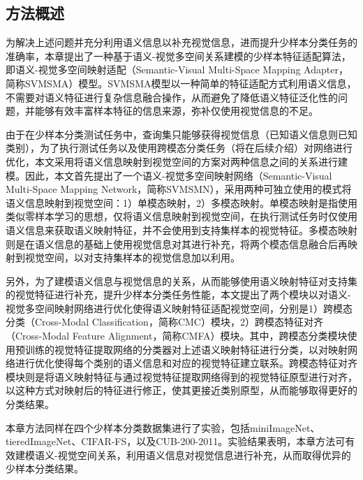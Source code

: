 \subsection[\hspace{-2pt}方法概述]{{\heiti{} \hspace{-8pt}方法概述}}\label{section4: 方法概述}

为解决上述问题并充分利用语义信息以补充视觉信息，进而提升少样本分类任务的准确率，本章提出了一种基于语义-视觉多空间关系建模的少样本特征适配算法，即语义-视觉多空间映射适配（Semantic-Visual Multi-Space Mapping Adapter，简称SVMSMA）模型。SVMSMA模型以一种简单的特征适配方式利用语义信息，不需要对语义特征进行复杂信息融合操作，从而避免了降低语义特征泛化性的问题，并能够有效丰富样本特征的信息来源，弥补仅使用视觉信息的不足。

由于在少样本分类测试任务中，查询集只能够获得视觉信息（已知语义信息则已知类别），为了执行测试任务以及使用跨模态分类任务（将在后续介绍）对网络进行优化，本文采用将语义信息映射到视觉空间的方案对两种信息之间的关系进行建模。因此，本文首先提出了一个语义-视觉多空间映射网络（Semantic-Visual Multi-Space Mapping Network，简称SVMSMN），采用两种可独立使用的模式将语义信息映射到视觉空间：1）单模态映射，2）多模态映射。单模态映射是指使用类似零样本学习的思想，仅将语义信息映射到视觉空间，在执行测试任务时仅使用语义信息来获取语义映射特征，并不会使用到支持集样本的视觉特征。多模态映射则是在语义信息的基础上使用视觉信息对其进行补充，将两个模态信息融合后再映射到视觉空间，以对支持集样本的视觉信息加以利用。

另外，为了建模语义信息与视觉信息的关系，从而能够使用语义映射特征对支持集的视觉特征进行补充，提升少样本分类任务性能，本文提出了两个模块以对语义-视觉多空间映射网络进行优化使得语义映射特征适配视觉空间，分别是1）跨模态分类（Cross-Modal Classification，简称CMC）模块，2）跨模态特征对齐（Cross-Modal Feature Alignment，简称CMFA）模块。其中，跨模态分类模块使用预训练的视觉特征提取网络的分类器对上述语义映射特征进行分类，以对映射网络进行优化使得每个类别的语义信息和对应的视觉特征建立联系。跨模态特征对齐模块则是将语义映射特征与通过视觉特征提取网络得到的视觉特征原型进行对齐，以这种方式对映射后的特征进行修正，使其更接近类别原型，从而能够取得更好的分类结果。

本章方法同样在四个少样本分类数据集进行了实验，包括miniImageNet\cite{vinyals2016matching}、tieredImageNet\cite{ren2018meta}、CIFAR-FS\cite{bertinetto2019meta}，以及CUB-200-2011\cite{wah2011caltech}。实验结果表明，本章方法可有效建模语义-视觉空间关系，利用语义信息对视觉信息进行补充，从而取得优异的少样本分类结果。


